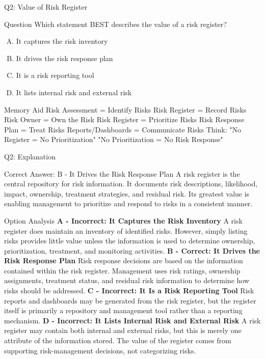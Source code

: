 \documentclass{beamer}
\begin{document}
	\begin{frame}{Q2: Value of Risk Register}
		\begin{block}{Question}
			Which statement BEST describes the value of a risk register?
		\end{block}
		\begin{enumerate}[(A)]
			\item It captures the risk inventory
			\item It drives the risk response plan
			\item It is a risk reporting tool
			\item It lists internal risk and external risk
		\end{enumerate}
		\begin{block}{Memory Aid} Risk Assessment = Identify Risks Risk Register = Record Risks Risk Owner = Own the Risk Risk Register = Prioritize Risks Risk Response Plan = Treat Risks Reports/Dashboards = Communicate Risks \vspace{0.15cm} Think: "No Register = No Prioritization" "No Prioritization = No Risk Response" \end{block}
	\end{frame}
	
\begin{frame}{Q2: Explanation} \footnotesize \begin{block}{Correct Answer: B - It Drives the Risk Response Plan} A risk register is the central repository for risk information. It documents risk descriptions, likelihood, impact, ownership, treatment strategies, and residual risk. Its greatest value is enabling management to prioritize and respond to risks in a consistent manner. \end{block} \begin{block}{Option Analysis} \textbf{A - Incorrect: It Captures the Risk Inventory} A risk register does maintain an inventory of identified risks. However, simply listing risks provides little value unless the information is used to determine ownership, prioritization, treatment, and monitoring activities. \vspace{0.15cm} \textbf{B - Correct: It Drives the Risk Response Plan} Risk response decisions are based on the information contained within the risk register. Management uses risk ratings, ownership assignments, treatment status, and residual risk information to determine how risks should be addressed. \vspace{0.15cm} \textbf{C - Incorrect: It Is a Risk Reporting Tool} Risk reports and dashboards may be generated from the risk register, but the register itself is primarily a repository and management tool rather than a reporting mechanism. \vspace{0.15cm} \textbf{D - Incorrect: It Lists Internal Risk and External Risk} A risk register may contain both internal and external risks, but this is merely one attribute of the information stored. The value of the register comes from supporting risk-management decisions, not categorizing risks. \end{block}  \end{frame}
	
\end{document}
